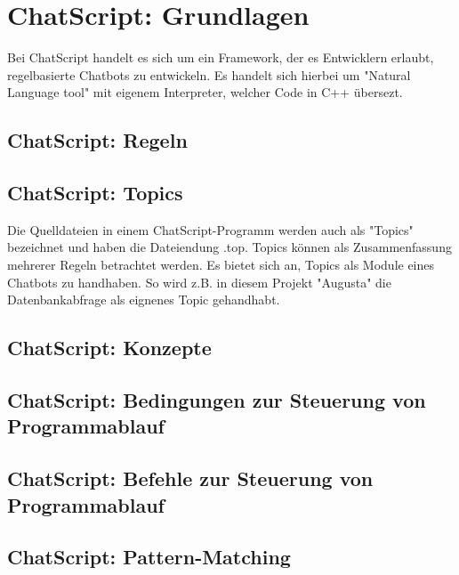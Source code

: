 \chapter{ChatScript: Grundlagen}
\label{sec:ChatScript: Grundlagen}

Bei ChatScript handelt es sich um ein Framework, der es Entwicklern erlaubt, regelbasierte Chatbots zu entwickeln. Es handelt sich hierbei um "Natural Language tool" mit eigenem Interpreter, welcher Code in C++ übersezt. 


 

\section{ChatScript: Regeln}
\label{sec:ChatScript: Regeln}

\section{ChatScript: Topics}
\label{sec:ChatScript: Topics}

Die Quelldateien in einem ChatScript-Programm werden auch als "Topics" bezeichnet und haben die Dateiendung .top. Topics können als Zusammenfassung mehrerer Regeln betrachtet werden. Es bietet sich an, Topics als Module eines Chatbots zu handhaben. So wird z.B. in diesem Projekt "Augusta" die Datenbankabfrage als eignenes Topic gehandhabt. 

\section{ChatScript: Konzepte}
\label{sec:ChatScript: Konzepte}

\section{ChatScript: Bedingungen zur Steuerung von Programmablauf}
\label{sec:ChatScript: Bedingungen zur Steuerung von Programmablauf}

\section{ChatScript: Befehle zur Steuerung von Programmablauf}
\label{sec:ChatScript: Befehle zur Steuerung von Programmablauf}

\section{ChatScript: Pattern-Matching}
\label{sec:ChatScript: Pattern-Matching}

